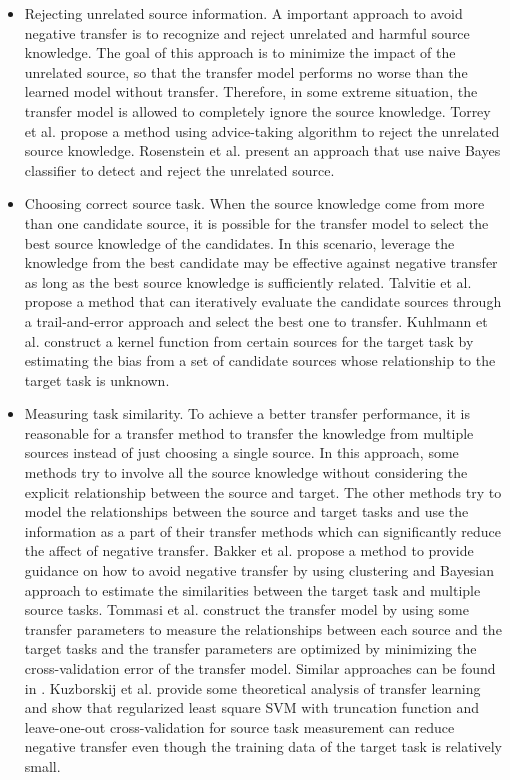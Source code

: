 \begin{itemize}
	\item Rejecting unrelated source information. A important approach to avoid negative transfer is to recognize and reject unrelated and harmful source knowledge. The goal of this approach is to minimize the impact of the unrelated source, so that the transfer model performs no worse than the learned model without transfer. Therefore, in some extreme situation, the transfer model is allowed to completely ignore the source knowledge. 
		Torrey et al. \cite{torrey2005using} propose a method using advice-taking algorithm to reject the unrelated source knowledge. 
		Rosenstein et al. \cite{rosenstein2005transfer} present an approach that use naive Bayes classifier to detect and reject the unrelated source.
	\item Choosing correct source task. When the source knowledge come from more than one candidate source, it is possible for the transfer model to select the best source knowledge of the candidates. In this scenario, leverage the knowledge from the best candidate may be effective against negative transfer as long as the best source knowledge is sufficiently related. 
		Talvitie et al. \cite{talvitie2007experts} propose a method that can iteratively evaluate the candidate sources through a trail-and-error approach and select the best one to transfer. Kuhlmann et al. \cite{kuhlmann2007graph} construct a kernel function from certain sources for the target task by estimating the bias from a set of candidate sources whose relationship to the target task is unknown.
	\item Measuring task similarity. To achieve a better transfer performance, it is reasonable for a transfer method to transfer the knowledge from multiple sources instead of just choosing a single source. In this approach, some methods try to involve all the source knowledge without considering the explicit relationship between the source and target. The other methods try to model the relationships between the source and target tasks and use the information as a part of their transfer methods which can significantly reduce the affect of negative transfer.
		 Bakker et al. \cite{bakker2003task} propose a method to provide guidance on how to avoid negative transfer by using clustering and Bayesian approach to estimate the similarities between the target task and multiple source tasks.
		 Tommasi et al. \cite{tommasi2014learning} construct the transfer model by using some transfer parameters to measure the relationships between each source and the target tasks and the transfer parameters are optimized by minimizing the cross-validation error of the transfer model. Similar approaches can be found in \cite{jie2011multiclass} \cite{kuzborskij2013n}.
		 Kuzborskij et al. \cite{kuzborskij2013stability} provide some theoretical analysis of transfer learning and show that regularized least square SVM with truncation function and leave-one-out cross-validation for source task measurement can reduce negative transfer even though the training data of the target task is relatively small.
\end{itemize}

